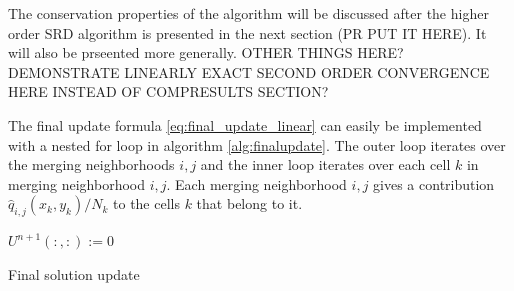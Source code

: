 The conservation properties of the algorithm will be discussed after the
higher order SRD algorithm is presented in the next
section (PR PUT IT HERE). It will also be prseented more generally.   
OTHER THINGS HERE? DEMONSTRATE LINEARLY EXACT SECOND ORDER CONVERGENCE
HERE INSTEAD OF COMPRESULTS SECTION?

The final update formula \eqref{eq:final_update_linear} can easily be implemented with a nested for loop in algorithm \ref{alg:finalupdate}.  
The outer loop iterates over the merging neighborhoods $i,j$ and the inner loop iterates over each cell $k$ in merging neighborhood $i,j$.  Each merging neighborhood $i,j$ gives a contribution $ \hat{q}_{i,j}(x_{k}, y_k)/N_{k} $ to the cells $k$ that belong to it.

\begin{algorithm}[H]
\SetAlgoLined
$U^{n+1}(:,:) := 0$\\
 \caption{\sf Final solution update} \label{alg:finalupdate}
\end{algorithm}

